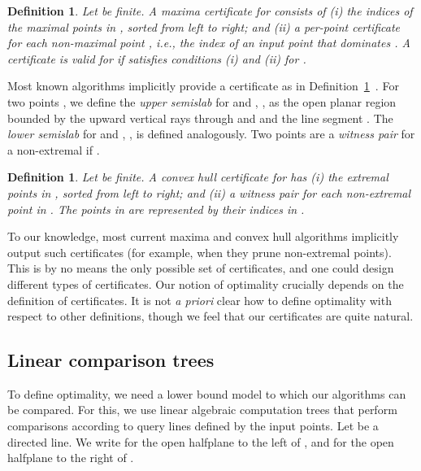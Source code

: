 \documentclass[letterpaper,11pt]{article}
\newtheorem{definition}[theorem]{Definition}
\begin{document}
\begin{definition}\label{def:cert-max}
  Let   be finite.
  A \emph{maxima certificate}  
  for  consists of \textup(i\textup) 
  the indices of the maximal points 
  in , sorted from left to right; 
  and \textup(ii\textup) a \emph{per-point 
  certificate} for each non-maximal 
  point , i.e., the index 
  of an input point that dominates 
  .  A certificate  is 
  \emph{valid} for  if  
  satisfies conditions (i) and (ii) 
  for .
\end{definition}

Most known algorithms implicitly 
provide a certificate as in 
Definition~\ref{def:cert-max}~\cite{KungLuPr75,Golin94,KirkpatrickSe86}. 
For two points , we 
define the \emph{upper semislab} 
for  and , ,
as the open planar region 
bounded by the upward vertical 
rays through  and  and 
the line segment . 
The \emph{lower semislab} for 
 and , ,
is defined analogously. Two 
points  are a 
\emph{witness pair} for a 
non-extremal  if 
.


\begin{definition}\label{def:cert-ch}
  Let  be finite. A 
  \emph{convex hull certificate}  
  for  has \textup(i\textup) 
  the extremal points in , sorted from 
  left to right; and \textup(ii\textup) a 
  witness pair for each non-extremal point 
  in . The points in  are 
  represented by their indices in .
\end{definition}

To our knowledge, most current maxima and convex hull algorithms implicitly output 
such certificates (for example, when they prune non-extremal points). This is by no means
the only possible set of certificates, and one could design different types of certificates. Our notion
of optimality crucially depends on the definition of certificates. It is not \emph{a priori} clear
how to define optimality with respect to other definitions, though we feel that our certificates are quite
natural.

\subsection{Linear comparison trees}

To define optimality, we need 
a lower bound model to which
our algorithms can be compared.
For this, we use linear algebraic 
computation trees that perform 
comparisons according to query lines 
defined by the input points. 
Let  be a directed line. We write 
 for the open halfplane
to the left of , and  for 
the open halfplane to the right of . 
\end{document}
